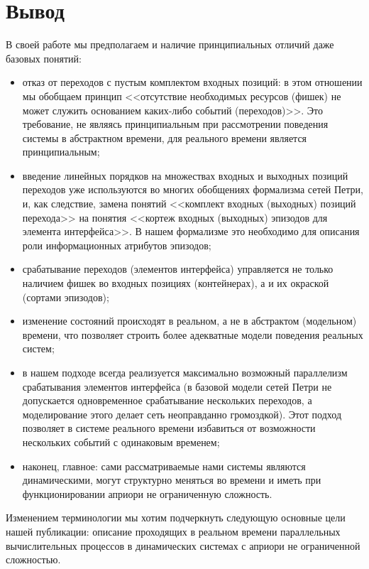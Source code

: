 \section{Вывод}
В своей работе мы предполагаем и наличие принципиальных отличий даже базовых понятий: 
\begin{itemize}
	\item отказ от переходов с пустым комплектом входных позиций: в этом отношении мы обобщаем принцип <<отсутствие необходимых ресурсов (фишек) не может служить основанием каких-либо событий (переходов)>>. Это требование, не являясь принципиальным при рассмотрении поведения системы в абстрактном времени, для реального времени является принципиальным;
	\item введение линейных порядков на множествах входных и выходных позиций переходов уже используются во многих обобщениях формализма сетей Петри, и, как следствие, замена понятий <<комплект входных (выходных) позиций перехода>> на понятия <<кортеж входных (выходных) эпизодов для элемента интерфейса>>. В  нашем формализме это необходимо для описания роли информационных атрибутов эпизодов;
	\item срабатывание переходов (элементов интерфейса) управляется не только наличием фишек во входных позициях (контейнерах), а и их окраской (сортами эпизодов);
	\item изменение состояний происходят в реальном, а не в абстрактом (модельном) времени, что позволяет строить более адекватные модели поведения реальных систем;
	\item в нашем подходе всегда реализуется максимально возможный параллелизм срабатывания элементов интерфейса (в базовой модели сетей Петри не допускается одновременное срабатывание нескольких переходов, а моделирование этого делает сеть неоправданно громоздкой). Этот подход позволяет в системе реального времени избавиться от возможности нескольких событий с одинаковым временем;
	\item наконец, главное: сами рассматриваемые нами системы являются динамическими, могут структурно меняться во времени и иметь при функционировании априори не ограниченную сложность.
\end{itemize}

Изменением терминологии мы хотим подчеркнуть следующую основные цели нашей публикации: описание проходящих в реальном времени параллельных вычислительных процессов в динамических системах с априори не ограниченной сложностью\cite{Falk}.